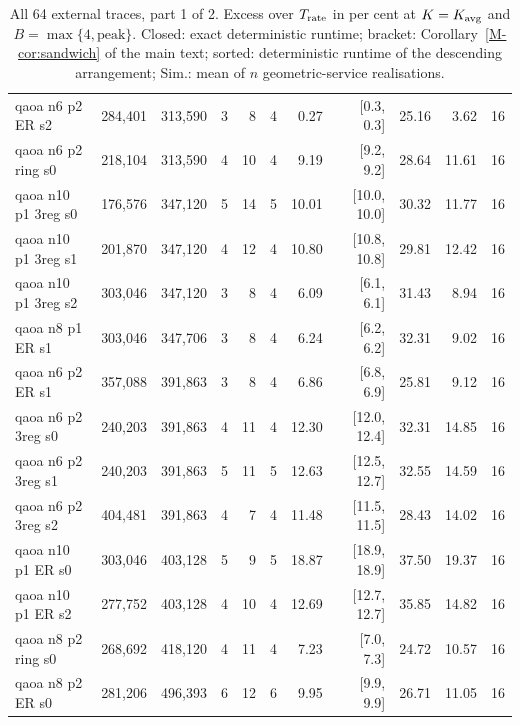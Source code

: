 \begin{table}[htbp]
\begin{tabular}{lrrrrrrrrrr}
qaoa n6 p2 ER s2 & 284,401 & 313,590 & 3 & 8 & 4 & 0.27 & [0.3, 0.3] & 25.16 & 3.62 & 16\\
qaoa n6 p2 ring s0 & 218,104 & 313,590 & 4 & 10 & 4 & 9.19 & [9.2, 9.2] & 28.64 & 11.61 & 16\\
qaoa n10 p1 3reg s0 & 176,576 & 347,120 & 5 & 14 & 5 & 10.01 & [10.0, 10.0] & 30.32 & 11.77 & 16\\
qaoa n10 p1 3reg s1 & 201,870 & 347,120 & 4 & 12 & 4 & 10.80 & [10.8, 10.8] & 29.81 & 12.42 & 16\\
qaoa n10 p1 3reg s2 & 303,046 & 347,120 & 3 & 8 & 4 & 6.09 & [6.1, 6.1] & 31.43 & 8.94 & 16\\
qaoa n8 p1 ER s1 & 303,046 & 347,706 & 3 & 8 & 4 & 6.24 & [6.2, 6.2] & 32.31 & 9.02 & 16\\
qaoa n6 p2 ER s1 & 357,088 & 391,863 & 3 & 8 & 4 & 6.86 & [6.8, 6.9] & 25.81 & 9.12 & 16\\
qaoa n6 p2 3reg s0 & 240,203 & 391,863 & 4 & 11 & 4 & 12.30 & [12.0, 12.4] & 32.31 & 14.85 & 16\\
qaoa n6 p2 3reg s1 & 240,203 & 391,863 & 5 & 11 & 5 & 12.63 & [12.5, 12.7] & 32.55 & 14.59 & 16\\
qaoa n6 p2 3reg s2 & 404,481 & 391,863 & 4 & 7 & 4 & 11.48 & [11.5, 11.5] & 28.43 & 14.02 & 16\\
qaoa n10 p1 ER s0 & 303,046 & 403,128 & 5 & 9 & 5 & 18.87 & [18.9, 18.9] & 37.50 & 19.37 & 16\\
qaoa n10 p1 ER s2 & 277,752 & 403,128 & 4 & 10 & 4 & 12.69 & [12.7, 12.7] & 35.85 & 14.82 & 16\\
qaoa n8 p2 ring s0 & 268,692 & 418,120 & 4 & 11 & 4 & 7.23 & [7.0, 7.3] & 24.72 & 10.57 & 16\\
qaoa n8 p2 ER s0 & 281,206 & 496,393 & 6 & 12 & 6 & 9.95 & [9.9, 9.9] & 26.71 & 11.05 & 16\\
\bottomrule
\end{tabular}
\caption{All 64 external traces, part 1 of 2. Excess over $T_{\rm rate}$ in per cent at $K=K_{\rm avg}$ and $B=\max\{4,\text{peak}\}$. Closed: exact deterministic runtime; bracket: Corollary~\ref{M-cor:sandwich} of the main text; sorted: deterministic runtime of the descending arrangement; Sim.: mean of $n$ geometric-service realisations.}
\label{tab:externalall1}
\end{table}
